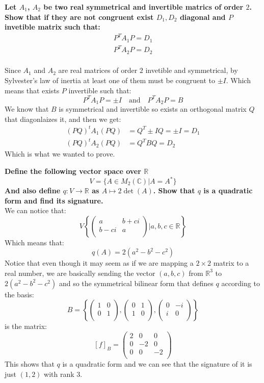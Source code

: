 \documentclass[11pt,a4paper]{article}
\theoremstyle{plain}
\newcommand{\R}{\mathbb{R}}
\newcommand{\C}{\mathbb{C}}
\begin{document}
	\newpage
	\noindent
	\textbf{Let $A_1$, $A_2$ be two real symmetrical and invertible matrics of 
	order $2$. Show that if they are not congruent exist $D_1, D_2$ diagonal
	and $P$ invetible matrix such that:
	\begin{align*}
		P^TA_1P = D_1 \\
		P^TA_2P = D_2
	\end{align*}} \\
	Since $A_1$ and $A_2$ are real matrices of order $2$ invetible and 
	symmetrical, by Sylvester's law of inertia at least one of them
	must be congruent to $\pm I$. Which means that exists $P$ invertible 
	such that:
	\[
		P^T A_1 P = \pm I \quad \text{and} \quad 
		P^T A_2 P = B
	\]
	We know that $B$ is symmetrical and invertible so exists an orthogonal
	matrix $Q$ that diagonlaizes it, and then we get:
	\begin{align*}
		(PQ)^t A_1 (PQ) &= Q^T \pm I Q = \pm I = D_1 \\
		(PQ)^t A_2 (PQ) &= Q^T B Q = D_2
	\end{align*}
	Which is what we wanted to prove.
	
	\newpage
	\noindent
	\textbf{Define the following vector space over $\R$
	\[
		V = \{A \in M_2(\C) \vert A = A^*\}
	\]
	And also define $q \colon V \to \R$ as 
	$
		A \mapsto 2 \det(A)
	$.
	Show that $q$ is a quadratic form and find its signature.} \\
	We can notice that:
	\[
		V \left\{
		\begin{pmatrix}
			a & b + ci\\
			b - ci & a\\
		\end{pmatrix}
		 \biggr\vert a,b,c\in\R
		 \right\}
	\]
	Which means that:
	\[
		q(A) = 2(a^2 - b^2 - c^2)
	\]
	Notice that even though it may seem as if we are mapping a $2 \times 2$
	matrix to a real number, we are basically sending the vector $(a,b,c)$
	from $\R^3$ to $2(a^2 - b^2 - c^2)$ and so the symmetrical bilinear
	form that defines $q$ according to the basis:
	\[
		B = 
		\left\{
			\begin{pmatrix}
				1 & 0\\
				0 & 1\\
			\end{pmatrix},
			\begin{pmatrix}
				0 & 1\\
				1 & 0\\
			\end{pmatrix},
			\begin{pmatrix}
				0 & -i\\
				i & 0\\
			\end{pmatrix}
		\right\}
	\]
	is the matrix:
	\[
	[f]_B = \begin{pmatrix}
		2 & 0 & 0\\
		0 & -2 & 0\\
		0 & 0 & -2\\
	\end{pmatrix}
	\]
	This shows that $q$ is a quadratic form and we can see that the signature
	of it is just $(1,2)$ with rank $3$.
	
\end{document}
